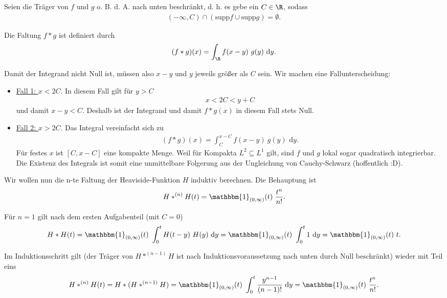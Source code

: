 \begin{solution}

  Seien die Träger von $f$ und $g$ o. B. d. A. nach unten beschränkt, d. h. es gebe ein $C \in \R$, sodass
  \begin{align}
      (-\infty, C) \cap (\text{supp} f \cup \text{supp} g) = \emptyset.
  \end{align}

  Die Faltung $f \ast g$ ist definiert durch
  \begin{align}
      (f \ast g)(x) = \int_\R f(x-y) ~g(y) \text{~d}y.
  \end{align}

  Damit der Integrand nicht Null ist, müssen also $x - y$ und $y$ jeweils größer als $C$ sein. Wir machen eine Fallunterscheidung:

  \begin{itemize}
      \item \underline{Fall 1: $x < 2C.$} In diesem Fall gilt für $y > C$
      \begin{align}
          x < 2C < y + C
      \end{align} und damit $x - y < C$. Deshalb ist der Integrand und damit $f \ast g(x)$ in diesem Fall stets Null.
      \item \underline{Fall 2: $x > 2C.$} Das Integral vereinfacht sich zu
  \begin{align}
     (f \ast g)(x) = \int_{C}^{x-C} f(x-y) ~g(y) \text{~d}y.
  \end{align}
  Für festes $x$ ist $[C, x-C]$ eine kompakte Menge. Weil für Kompakta $L^2 \subseteq L^1$ gilt, sind $f$ und $g$ lokal sogar quadratisch integrierbar. Die Existenz des Integrals ist somit eine unmittelbare Folgerung aus der Ungleichung von Cauchy-Schwarz (hoffentlich :D).
  \end{itemize}

  Wir wollen nun die n-te Faltung der Heaviside-Funktion $H$ induktiv berechnen. Die Behauptung ist
  \begin{align}
      H \ast^{(n)} H(t) = \mathbbm{1}_{(0, \infty)} (t) ~ \frac{t^n}{n!}.
  \end{align}

  Für $n = 1$ gilt nach dem ersten Aufgabenteil (mit $C = 0$)
  \begin{align}
      H \ast H(t) = \mathbbm{1}_{(0, \infty)} (t) ~ \int_0^t H(t-y) ~H(y) \text{~d}y = \mathbbm{1}_{(0, \infty)} (t) ~ \int_0^t 1 \text{~d}y = \mathbbm{1}_{(0, \infty)} (t) ~ t.
  \end{align}

  Im Induktionsschritt gilt (der Träger von $H \ast^{(n-1)} H$ ist nach Induktionsvoraussetzung nach unten durch Null beschränkt) wieder mit Teil eins
  \begin{align}
      H \ast^{(n)} H(t) = H \ast (H \ast^{(n-1)} H) = \mathbbm{1}_{(0, \infty)}(t) ~ \int_0^t \frac{y^{n-1}}{(n-1)!} \text{~d}y =  \mathbbm{1}_{(0, \infty)}(t) ~ \frac{t^n}{n!}.
  \end{align}
\end{solution}

